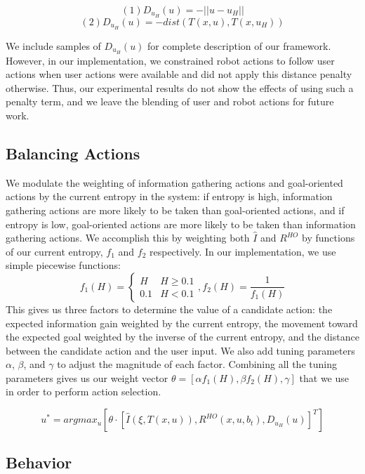 \documentclass[conference]{IEEEtran}
\begin{document}
\[
(1) D_{u_H}(u) = -||u - u_H||
\]
\[
(2) D_{u_H}(u) = -dist(T(x,u), T(x, u_H))
\]

We include samples of $D_{u_H}(u)$ for complete description of our framework. However, in our implementation, we constrained robot actions to follow user actions when user actions were available and did not apply this distance penalty otherwise. Thus, our experimental results do not show the effects of using such a penalty term, and we leave the blending of user and robot actions for future work.

\subsection{Balancing Actions}

We modulate the weighting of information gathering actions and goal-oriented actions by the current entropy in the system: if entropy is high, information gathering actions are more likely to be taken than goal-oriented actions, and if entropy is low, goal-oriented actions are more likely to be taken than information gathering actions. We accomplish this by weighting both $\hat{I}$ and $R^{HO}$ by functions of our current entropy, $f_1$ and $f_2$ respectively. In our implementation, we use simple piecewise functions:
\[
f_1(H) =
\begin{cases}
H & H\geq 0.1 \\
0.1 & H < 0.1
\end{cases}
,f_2(H) = \frac{1}{f_1(H)}
\]
This gives us three factors to determine the value of a candidate action: the expected information gain weighted by the current entropy, the movement toward the expected goal weighted by the inverse of the current entropy, and the distance between the candidate action and the user input. We also add tuning parameters $\alpha$, $\beta$, and $\gamma$ to adjust the magnitude of each factor. Combining all the tuning parameters gives us our weight vector $\theta = [\alpha f_1(H), \beta f_2(H), \gamma]$ that we use in order to perform action selection.

\[
u^* = argmax_u [ \theta \cdot [\hat{I}(\xi, T(x,u)), R^{HO}(x,u,b_t), D_{u_H}(u)]^T ]
\]

\subsection{Behavior}
\end{document}
